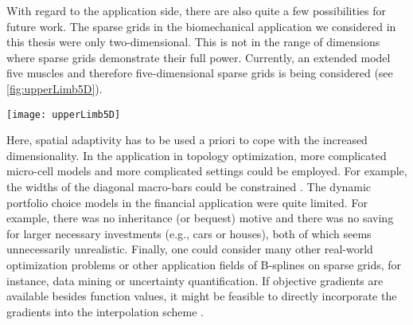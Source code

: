With regard to the application side, there are also quite a few
possibilities for future work.
The sparse grids in the biomechanical application
we considered in this thesis were only two-dimensional.
This is not in the range of dimensions where sparse grids
demonstrate their full power.
Currently, an extended model five muscles and therefore
five-dimensional sparse grids is being considered
(see \cref{fig:upperLimb5D}).
\begin{SCfigure}
  \texttt{[image: upperLimb5D]}%
  \caption[Extended model of the human upper limb with five muscles]{%
    Extended model of the human upper limb with
    the three bones humerus, ulna, and radius \emph{(light brown)} and
    the five muscles
    triceps, biceps, anonceus, brachialis, and brachioradialis
    \emph{(colored).}
    Each muscle has associated tendon and muscle-tendon complexes.
    Biceps and brachioradialis have each been fixed with one and two bands
    to simulate the effect of the missing skin.
    Without the bands, the muscles would raise unnaturally from the bones.%
  }%
  \label{fig:upperLimb5D}%
\end{SCfigure}%
Here, spatial adaptivity has to be used a priori to cope with
the increased dimensionality.
In the application in topology optimization,
more complicated micro-cell models and more complicated
settings could be employed.
For example, the widths of the diagonal macro-bars could be constrained
\cite{Allaire16Towards}.
The dynamic portfolio choice models in the financial application
were quite limited.
For example, there was no inheritance (or bequest) motive
and there was no saving for larger necessary investments
(e.g., cars or houses), both of which seems unnecessarily unrealistic.
Finally, one could consider many other real-world optimization problems
or other application fields of B-splines on sparse grids,
for instance, data mining or uncertainty quantification.
If objective gradients are available besides function values,
it might be feasible to directly incorporate the gradients into
the interpolation scheme \cite{Baar15Gradient}.


  
  
